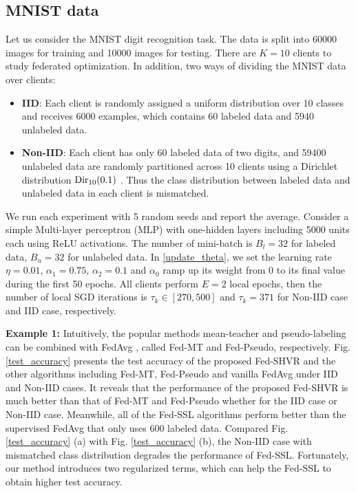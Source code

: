 \documentclass[twoside,journal]{IEEEtran}
\begin{document}
\subsection{MNIST data}
Let us consider the MNIST digit recognition task.  The data is split into 60000
 images for training and 10000 images for testing.  There are $K=10$ clients to study federated optimization. In addition,
 two ways of dividing  the MNIST data over clients:
 \begin{itemize}
\item \textbf{IID}: Each client is randomly assigned a uniform distribution over 10 classes and receives 6000 examples, which contains 60 labeled data and 5940 unlabeled data.
\item \textbf{Non-IID}: Each client has only 60 labeled data of two digits, and
59400 unlabeled data are randomly partitioned
across 10 clients using a Dirichlet distribution $\textmd{Dir}_{10}(0.1)$ \cite{wang2021demystifying}. Thus  the class distribution between labeled data and unlabeled data in each client is  mismatched.
\end{itemize}
 We run each experiment with 5 random seeds
and report the average.
Consider a simple Multi-layer perceptron (MLP) with one-hidden layers including 5000 units each using ReLU activations. The number of mini-batch is $B_l=32$ for labeled data, $B_u=32$ for unlabeled data. In \eqref{update_theta}, we set the learning rate $\eta=0.01$, $\alpha_1=0.75$, $\alpha_2=0.1$ and $\alpha_{0}$ ramp up its weight from 0 to
its final value during the first 50 epochs. All
clients perform $E=2$ local epochs, then the number of local SGD iterations is $\tau_k\in [270,500]$ and $\tau_k=371$ for Non-IID case and IID case, respectively.

\textbf{Example 1:} Intuitively, the popular methods mean-teacher \cite{tarvainen2017} and pseudo-labeling \cite{lee2013pseudo} can be combined with FedAvg \cite{McMahan2017}, called Fed-MT and Fed-Pseudo, respectively. Fig. \ref{test_accuracy} presents the test accuracy of the proposed Fed-SHVR and the other algorithms including Fed-MT, Fed-Pseudo and vanilla FedAvg under IID and Non-IID cases.
It reveals that the performance of the proposed Fed-SHVR is much better than that of  Fed-MT and Fed-Pseudo whether for the IID case or  Non-IID case. Meanwhile, all of the Fed-SSL algorithms perform better than the supervised FedAvg that only uses 600 labeled data. Compared Fig. \ref{test_accuracy} (a) with Fig. \ref{test_accuracy} (b), the Non-IID case with mismatched class distribution degrades the performance of Fed-SSL. Fortunately, our method introduces two regularized terms, which can help the Fed-SSL to obtain higher test accuracy.
\end{document}
